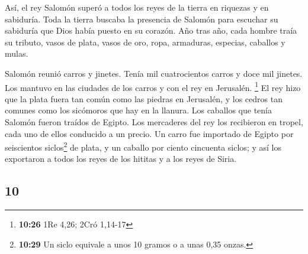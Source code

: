 \begin{paracol}{2}
 Así, el rey Salomón superó a todos los reyes de la
tierra en riquezas y en sabiduría.  Toda la tierra
buscaba la presencia de Salomón para escuchar su sabiduría que Dios
había puesto en su corazón.  Año tras año, cada hombre
traía su tributo, vasos de plata, vasos de oro, ropa, armaduras,
especias, caballos y mulas.

 Salomón reunió carros y jinetes. Tenía mil cuatrocientos
carros y doce mil jinetes. Los mantuvo en las ciudades de los carros y
con el rey en Jerusalén. \footnote{\textbf{10:26} 1Re 4,26; 2Cró 1,14-17}
 El rey hizo que la plata fuera tan común como las
piedras en Jerusalén, y los cedros tan comunes como los sicómoros que
hay en la llanura.  Los caballos que tenía Salomón fueron
traídos de Egipto. Los mercaderes del rey los recibieron en tropel, cada
uno de ellos conducido a un precio.  Un carro fue
importado de Egipto por seiscientos siclos\footnote{\textbf{10:29} Un
  siclo equivale a unos 10 gramos o a unas 0,35 onzas.} de plata, y un
caballo por ciento cincuenta siclos; y así los exportaron a todos los
reyes de los hititas y a los reyes de Siria.

\switchcolumn
\begin{otherlanguage}{english}

\hypertarget{section-19}{%
\section{10}\label{section-19}}


\end{otherlanguage}
\end{paracol}
